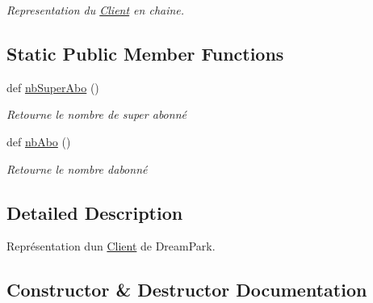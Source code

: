 \begin{DoxyCompactItemize}
\begin{DoxyCompactList}\small\item\em Representation du \hyperlink{classsrc_1_1m_1_1_abonnement_1_1_client}{Client} en chaine. \end{DoxyCompactList}\end{DoxyCompactItemize}
\subsection*{Static Public Member Functions}
\begin{DoxyCompactItemize}
\item 
def \hyperlink{classsrc_1_1m_1_1_abonnement_1_1_client_ad9773dc71ddfdadab1d9f6d055542020}{nb\+Super\+Abo} ()
\begin{DoxyCompactList}\small\item\em Retourne le nombre de super abonné \end{DoxyCompactList}\item 
def \hyperlink{classsrc_1_1m_1_1_abonnement_1_1_client_a6e58b503a5e396849136bf1b6c69c0d4}{nb\+Abo} ()
\begin{DoxyCompactList}\small\item\em Retourne le nombre d\textquotesingle{}abonné \end{DoxyCompactList}\end{DoxyCompactItemize}


\subsection{Detailed Description}
Représentation d\textquotesingle{}un \hyperlink{classsrc_1_1m_1_1_abonnement_1_1_client}{Client} de Dream\+Park. 

\subsection{Constructor \& Destructor Documentation}
\hypertarget{classsrc_1_1m_1_1_abonnement_1_1_client_a53746d797b85e8dc5a990292b7ba9871}{}

